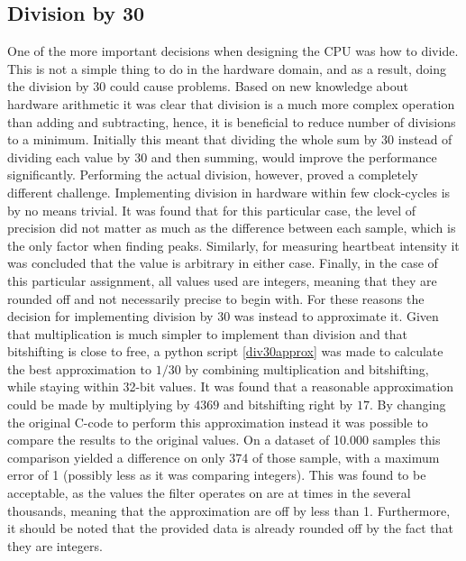 \documentclass[12pt,a4paper]{article}
\begin{document}
\subsection{Division by 30}
One of the more important decisions when designing the CPU was how to divide. This is not a simple thing to do in the hardware domain, and as a result, doing the division by 30 could cause problems. Based on new knowledge about hardware arithmetic it was clear that division is a much more complex operation than adding and subtracting, hence, it is beneficial to reduce number of divisions to a minimum. Initially this meant that dividing the whole sum by 30 instead of dividing each value by 30 and then summing, would improve the performance significantly.
Performing the actual division, however, proved a completely different challenge. Implementing division in hardware within few clock-cycles is by no means trivial. It was found that for this particular case, the level of precision did not matter as much as the difference between each sample, which is the only factor when finding peaks. Similarly, for measuring heartbeat intensity it was concluded that the value is arbitrary in either case. Finally, in the case of this particular assignment, all values used are integers, meaning that they are rounded off and not necessarily precise to begin with. For these reasons the decision for implementing division by 30 was instead to approximate it.
	Given that multiplication is much simpler to implement than division and that bitshifting is close to free, a python script \ref{div30approx} was made to calculate the best approximation to $1/30$ by combining multiplication and bitshifting, while staying within 32-bit values.
	It was found that a reasonable approximation could be made by multiplying by $4369$ and bitshifting right by $17$. By changing the original C-code to perform this approximation instead it was possible to compare the results to the original values. On a dataset of 10.000 samples this comparison yielded a difference on only 374 of those sample, with a maximum error of 1 (possibly less as it was comparing integers). This was found to be acceptable, as the values the filter operates on are at times in the several thousands, meaning that the approximation are off by less than 1\textperthousand. Furthermore, it should be noted that the provided data is already rounded off by the fact that they are integers.\\
\end{document}
